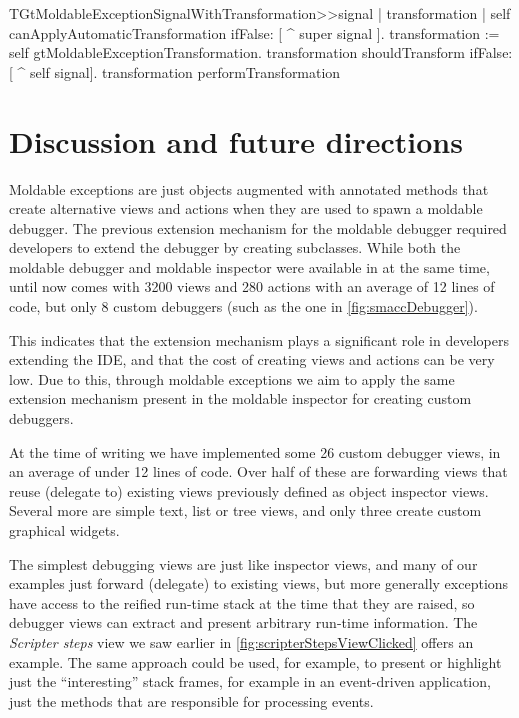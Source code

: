 \documentclass[sigplan,10pt]{acmart}
\newcommand\on[1]{\nbc{ON}{#1}{olive}} %
\newcommand{\GT}{\lst{GT}\xspace} %
\begin{document}
\begin{code}
TGtMoldableExceptionSignalWithTransformation>>signal
	| transformation |
	self canApplyAutomaticTransformation
		ifFalse: [ ^ super signal ].
	transformation := self gtMoldableExceptionTransformation.
	transformation shouldTransform
		ifFalse: [ ^ self signal].
	transformation performTransformation
\end{code}

\on{AC -- makes sense to me. Can you confirm?}

\section{Discussion and future directions}\label{sec:directions}

Moldable exceptions are just objects augmented with annotated methods that create alternative views and actions when they are used to spawn a moldable debugger.
The previous extension mechanism for the moldable debugger required developers to extend the debugger by creating subclasses.
While both the moldable debugger and moldable inspector were available in \GT at the same time, until now \GT comes with 3200 views and 280 actions with an average of 12 lines of code, but only 8 custom debuggers (such as the one in  \autoref{fig:smaccDebugger}).

This indicates that the extension mechanism plays a significant role in developers extending the IDE, and that the cost of creating views and actions can be very low.
Due to this, through moldable exceptions we aim to apply the same extension mechanism present in the moldable inspector for creating custom debuggers.

At the time of writing we have implemented some 26 custom debugger views, in an average of under 12 lines of code.
Over half of these are forwarding views that reuse (delegate to) existing views previously defined as object inspector views.
Several more are simple text, list or tree views, and only three create custom graphical widgets.

The simplest debugging views are just like inspector views, and many of our examples just forward (delegate) to existing views, but more generally exceptions have access to the reified run-time stack at the time that they are raised, so debugger views can extract and present arbitrary run-time information.
The \emph{Scripter steps} view we saw earlier in \autoref{fig:scripterStepsViewClicked} offers an example.
The same approach could be used, for example, to present or highlight just the ``interesting'' stack frames, for example in an event-driven application, just the methods that are responsible for processing events.
\end{document}
